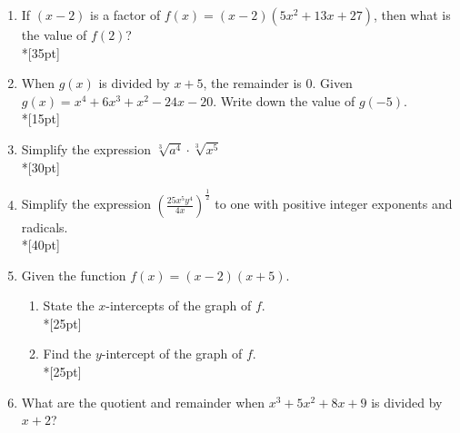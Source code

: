 \documentclass[12pt, oneside]{article}
\begin{document}
\begin{enumerate}
\item If $(x-2)$ is a factor of $f(x)=(x-2)(5x^2+13x+27)$, then what is the value of $f(2)$?\\*[35pt]

\item When $g(x)$ is divided by $x+5$, the remainder is 0. Given $g(x)=x^4+6x^3+x^2-24x-20$. Write down the value of $g(-5)$.\\*[15pt]

\item Simplify the expression $\sqrt[3]{a^4} \cdot \sqrt[3]{x^5}$ \\*[30pt]

\item Simplify the expression $\displaystyle \left( \frac{25x^{5}y^4}{4x} \right)^{\frac{1}{2}}$ to one with positive integer exponents and radicals.\\*[40pt]

\newpage
\item Given the function $f(x)=(x-2)(x+5)$. 
\begin{enumerate}
    \item State the $x$-intercepts of the graph of $f$. \\*[25pt]
    \item Find the $y$-intercept of the graph of $f$.\\*[25pt]
\end{enumerate}



\item What are the quotient and remainder when $x^3+5x^2+8x+9$ is divided by $x+2$?


\end{enumerate}
\end{document}
